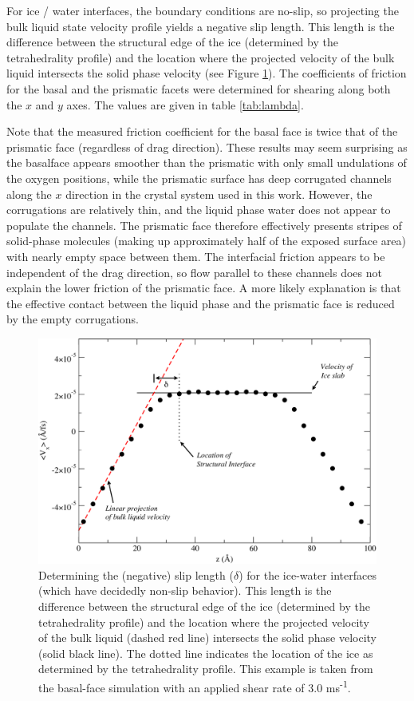 For ice / water interfaces, the boundary conditions are no-slip, so
projecting the bulk liquid state velocity profile yields a negative
slip length. This length is the difference between the structural edge
of the ice (determined by the tetrahedrality profile) and the location
where the projected velocity of the bulk liquid intersects the solid
phase velocity (see Figure \ref{fig:delta_example}). The coefficients
of friction for the basal and the prismatic facets were determined for
shearing along both the $x$ and $y$ axes.  The values are given in
table \ref{tab:lambda}. 

Note that the measured friction coefficient for the basal face is
twice that of the prismatic face (regardless of drag direction).
These results may seem surprising as the basalface appears smoother
than the prismatic with only small undulations of the oxygen
positions, while the prismatic surface has deep corrugated channels
along the $x$ direction in the crystal system used in this work.
However, the corrugations are relatively thin, and the liquid phase
water does not appear to populate the channels.  The prismatic face
therefore effectively presents stripes of solid-phase molecules
(making up approximately half of the exposed surface area) with nearly
empty space between them. The interfacial friction appears to be
independent of the drag direction, so flow parallel to these channels
does not explain the lower friction of the prismatic face.  A more
likely explanation is that the effective contact between the liquid
phase and the prismatic face is reduced by the empty corrugations.  

\begin{figure}
\includegraphics[width=\linewidth]{Figures/delta_example}
\caption{\label{fig:delta_example} Determining the (negative) slip
  length ($\delta$) for the ice-water interfaces (which have decidedly
  non-slip behavior).  This length is the difference between the
  structural edge of the ice (determined by the tetrahedrality
  profile) and the location where the projected velocity of the bulk
  liquid (dashed red line) intersects the solid phase velocity (solid
  black line).  The dotted line indicates the location of the ice as
  determined by the tetrahedrality profile.  This example is taken
  from the basal-face simulation with an applied shear rate of 3.0 ms\textsuperscript{-1}.}
\end{figure}


